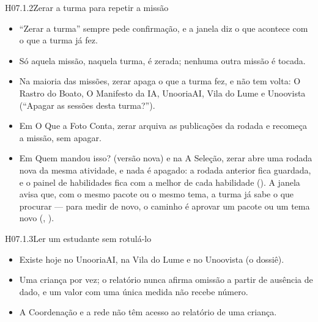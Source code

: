 \begin{historia}{H07.1.2}{Zerar a turma para repetir a missão}{\pronto}
\aceite
\begin{itemize}
  \item \enquote{Zerar a turma} sempre pede confirmação, e a janela diz o que
    acontece com o que a turma já fez.
  \item Só aquela missão, naquela turma, é zerada; nenhuma outra missão é
    tocada.
  \item Na maioria das missões, zerar apaga o que a turma fez, e não tem volta:
    O Rastro do Boato, O Manifesto da IA, UnooriaAI, Vila do Lume e Unoovista
    (\enquote{Apagar as sessões desta turma?}).
  \item Em O Que a Foto Conta, zerar arquiva as publicações da rodada e
    recomeça a missão, sem apagar.
  \item Em Quem mandou isso? (versão nova) e na A Seleção, zerar abre uma
    rodada nova da mesma atividade, e nada é apagado: a rodada anterior fica
    guardada, e o painel de habilidades fica com a melhor de cada habilidade
    (). A janela avisa que, com o mesmo pacote ou o mesmo tema, a turma
    já sabe o que procurar --- para medir de novo, o caminho é aprovar um pacote
    ou um tema novo (, ).
\end{itemize}
\end{historia}

\begin{historia}{H07.1.3}{Ler um estudante sem rotulá-lo}{\pronto}
\aceite
\begin{itemize}
  \item Existe hoje no UnooriaAI, na Vila do Lume e no Unoovista (o dossiê).
  \item Uma criança por vez; o relatório nunca afirma omissão a partir de
    ausência de dado, e um valor com uma única medida não recebe número.
  \item A Coordenação e a rede não têm acesso ao relatório de uma criança.
\end{itemize}
\end{historia}


